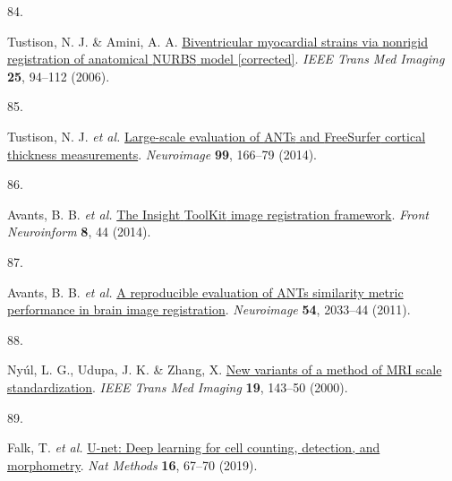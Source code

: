 \documentclass[
  12pt,
]{article}
\newlength{\cslhangindent}
\newlength{\csllabelwidth}
\newenvironment{CSLReferences}[2] %
 {\begin{list}{}{%
  \setlength{\itemindent}{0pt}
  \setlength{\leftmargin}{0pt}
  \setlength{\parsep}{0pt}
  \ifodd #1
   \setlength{\leftmargin}{\cslhangindent}
   \setlength{\itemindent}{-1\cslhangindent}
  \fi
  \setlength{\itemsep}{#2\baselineskip}}}
 {\end{list}}
\newcommand{\CSLLeftMargin}[1]{\parbox[t]{\csllabelwidth}{\strut#1\strut}}
\newcommand{\CSLRightInline}[1]{\parbox[t]{\linewidth - \csllabelwidth}{\strut#1\strut}}
\begin{document}
\begin{CSLReferences}{0}{0}
\CSLLeftMargin{84. }%
\CSLRightInline{Tustison, N. J. \& Amini, A. A.
\href{https://doi.org/10.1109/TMI.2005.861015}{Biventricular myocardial
strains via nonrigid registration of anatomical {NURBS} model
{[}corrected{]}}. \emph{IEEE Trans Med Imaging} \textbf{25}, 94--112
(2006).}

\CSLLeftMargin{85. }%
\CSLRightInline{Tustison, N. J. \emph{et al.}
\href{https://doi.org/10.1016/j.neuroimage.2014.05.044}{Large-scale
evaluation of {ANTs} and {FreeSurfer} cortical thickness measurements}.
\emph{Neuroimage} \textbf{99}, 166--79 (2014).}

\CSLLeftMargin{86. }%
\CSLRightInline{Avants, B. B. \emph{et al.}
\href{https://doi.org/10.3389/fninf.2014.00044}{The {Insight} {ToolKit}
image registration framework}. \emph{Front Neuroinform} \textbf{8}, 44
(2014).}

\CSLLeftMargin{87. }%
\CSLRightInline{Avants, B. B. \emph{et al.}
\href{https://doi.org/10.1016/j.neuroimage.2010.09.025}{A reproducible
evaluation of ANTs similarity metric performance in brain image
registration}. \emph{Neuroimage} \textbf{54}, 2033--44 (2011).}

\CSLLeftMargin{88. }%
\CSLRightInline{Nyúl, L. G., Udupa, J. K. \& Zhang, X.
\href{https://doi.org/10.1109/42.836373}{New variants of a method of MRI
scale standardization}. \emph{IEEE Trans Med Imaging} \textbf{19},
143--50 (2000).}

\CSLLeftMargin{89. }%
\CSLRightInline{Falk, T. \emph{et al.}
\href{https://doi.org/10.1038/s41592-018-0261-2}{U-net: Deep learning
for cell counting, detection, and morphometry}. \emph{Nat Methods}
\textbf{16}, 67--70 (2019).}

\end{CSLReferences}
\end{document}
